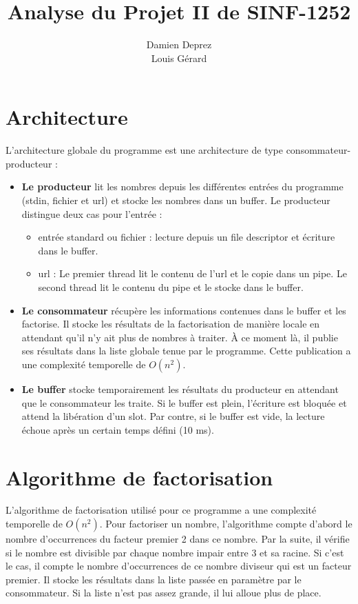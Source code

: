 \documentclass[12pt]{article}
\begin{document}
\title{Analyse du Projet II de SINF-1252}
\author{Damien Deprez \\ Louis Gérard}
\section{Architecture}
L'architecture globale du programme est une architecture de type consommateur-producteur : 
\begin{itemize}
\item \textbf{Le producteur} lit les nombres depuis les différentes entrées du programme (stdin, fichier et url) et stocke les nombres dans un buffer. Le producteur distingue deux cas pour l'entrée : 
\begin{itemize}
\item entrée standard ou fichier : lecture depuis un file descriptor et écriture dans le buffer.
\item url : Le premier thread lit le contenu de l'url et le copie dans un pipe. Le second thread lit le contenu du pipe et le stocke dans le buffer.
\end{itemize}
\item \textbf{Le consommateur} récupère les informations contenues dans le buffer et les factorise. Il stocke les résultats de la factorisation de manière locale en attendant qu'il n'y ait plus de nombres à traiter. À ce moment là, il publie ses résultats dans la liste globale tenue par le programme. Cette publication a une complexité temporelle de $O(n^2)$.

\item \textbf{Le buffer} stocke temporairement les résultats du producteur en attendant que le consommateur les traite. Si le buffer est plein, l'écriture est bloquée et attend la libération d'un slot. Par contre, si le buffer est vide, la lecture échoue après un certain temps défini (10 ms).
\end{itemize}

\section{Algorithme de factorisation}
L'algorithme de factorisation utilisé pour ce programme a une complexité temporelle de $O(n^2)$. Pour factoriser un nombre, l'algorithme compte d'abord le nombre d'occurrences du facteur premier 2 dans ce nombre. Par la suite, il vérifie si le nombre est divisible par chaque nombre impair entre 3 et sa racine. Si c'est le cas, il compte le nombre d'occurrences de ce nombre diviseur qui est un facteur premier. Il stocke les résultats dans la liste passée en paramètre par le consommateur. Si la liste n'est pas assez grande, il lui alloue plus de place.
\end{document}
